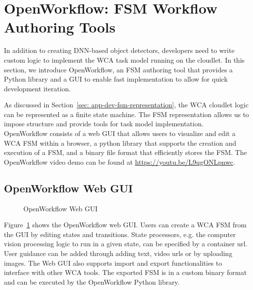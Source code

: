 \section{OpenWorkflow: FSM Workflow Authoring Tools}
\label{sec: app-dev-fsm}

In addition to creating DNN-based object detectors, developers need to write
custom logic to implement the WCA task model running on the cloudlet. In this
section, we introduce OpenWorkflow, an FSM authoring tool that provides a Python
library and a GUI to enable fast implementation to allow for quick development
iteration.

As discussed in Section~\ref{sec: app-dev-fsm-representation}, the WCA cloudlet
logic can be represented as a finite state machine. The FSM representation
allows us to impose structure and provide tools for task model implementation.
OpenWorkflow consists of a web GUI that allows users to visualize and
edit a WCA FSM within a browser, a python library that supports the creation and
execution of a FSM, and a binary file format that efficiently stores the FSM.
The OpenWorkflow video demo can be found at \url{https://youtu.be/L9ugONLpnwc}.

\subsection{OpenWorkflow Web GUI}

\begin{figure}
    \centering
	\caption{OpenWorkflow Web GUI}
    \label{figs:fsm-web-gui}
\end{figure}

Figure~\ref{figs:fsm-web-gui} shows the OpenWorkflow web GUI. Users can create a WCA
FSM from the GUI by editing states and transitions. State processors, e.g. the
computer vision processing logic to run in a given state, can be specified by a
container url. User guidance can be added through adding text, video urls or by
uploading images. The Web GUI also supports import and export functionalities to
interface with other WCA tools. The exported FSM is in a custom binary format
and can be executed by the OpenWorkflow Python library.

